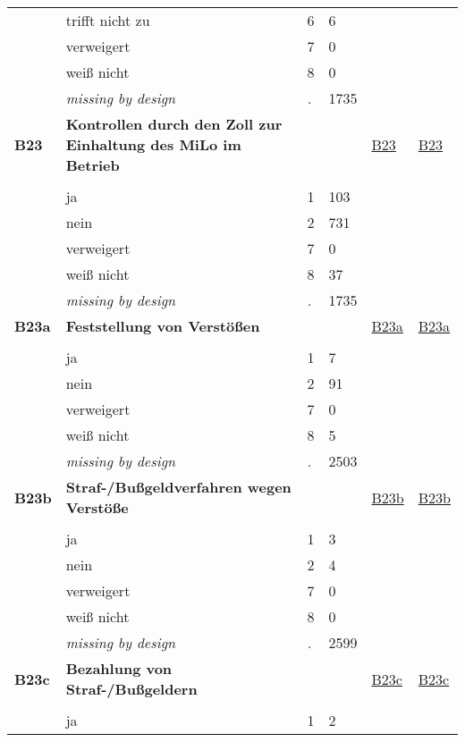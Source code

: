 \begin{longtable}{| L{2.45cm} | L{6cm} | C{1.5cm} | R{1cm} | C{2.25cm} | C{2.25cm} |}
   & trifft nicht zu & 6 & 6 &  &  \\ 
   & verweigert & 7 & 0 &  &  \\ 
   & weiß nicht & 8 & 0 &  &  \\ 
   & \textit{missing by design} & \textit{.} & 1735 &  &  \\ 
   \midrule
\textbf{B23}\label{var:B23} & \textbf{Kontrollen durch den Zoll zur Einhaltung des MiLo im Betrieb} &  &  & \hyperref[B23]{B23} & \hyperref[var:suf:B23]{B23} \\ 
   &  &  &  &  &  \\ 
   & ja & 1 & 103 &  &  \\ 
   & nein & 2 & 731 &  &  \\ 
   & verweigert & 7 & 0 &  &  \\ 
   & weiß nicht & 8 & 37 &  &  \\ 
   & \textit{missing by design} & \textit{.} & 1735 &  &  \\ 
   \midrule
\textbf{B23a}\label{var:B23a} & \textbf{Feststellung von Verstößen} &  &  & \hyperref[B23a]{B23a} & \hyperref[var:suf:B23a]{B23a} \\ 
   &  &  &  &  &  \\ 
   & ja & 1 & 7 &  &  \\ 
   & nein & 2 & 91 &  &  \\ 
   & verweigert & 7 & 0 &  &  \\ 
   & weiß nicht & 8 & 5 &  &  \\ 
   & \textit{missing by design} & \textit{.} & 2503 &  &  \\ 
   \midrule
\textbf{B23b}\label{var:B23b} & \textbf{Straf-/Bußgeldverfahren wegen Verstöße} &  &  & \hyperref[B23b]{B23b} & \hyperref[var:suf:B23b]{B23b} \\ 
   &  &  &  &  &  \\ 
   & ja & 1 & 3 &  &  \\ 
   & nein & 2 & 4 &  &  \\ 
   & verweigert & 7 & 0 &  &  \\ 
   & weiß nicht & 8 & 0 &  &  \\ 
   & \textit{missing by design} & \textit{.} & 2599 &  &  \\ 
   \midrule
\textbf{B23c}\label{var:B23c} & \textbf{Bezahlung von Straf-/Bußgeldern} &  &  & \hyperref[B23c]{B23c} & \hyperref[var:suf:B23c]{B23c} \\ 
   &  &  &  &  &  \\ 
   & ja & 1 & 2 &  &  \\ 

\end{longtable}
